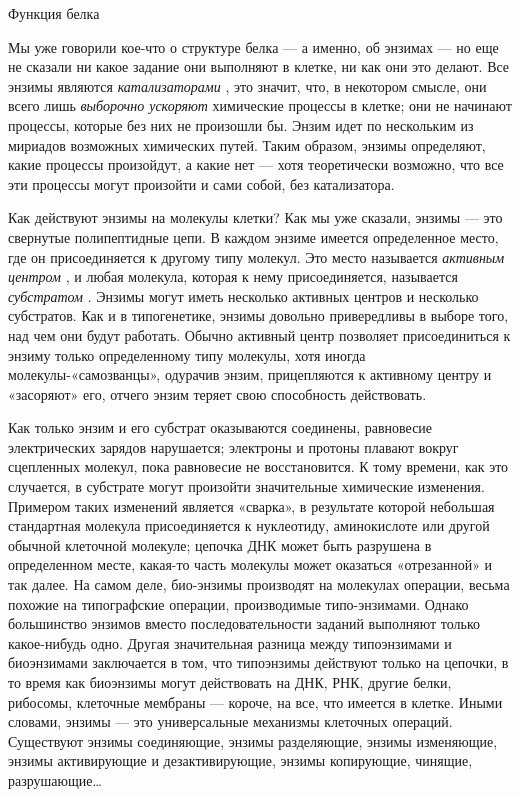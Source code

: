 \documentclass[../main.tex]{subfiles}
\begin{document}
Функция белка

Мы уже говорили кое-что о структуре белка --- а именно, об энзимах --- но еще не сказали ни какое задание они выполняют в клетке, ни как они это делают. Все энзимы являются \emph{катализаторами} , это значит, что, в некотором смысле, они всего лишь \emph{выборочно ускоряют} химические процессы в клетке; они не начинают процессы, которые без них не произошли бы. Энзим идет по нескольким из мириадов возможных химических путей. Таким образом, энзимы определяют, какие процессы произойдут, а какие нет --- хотя теоретически возможно, что все эти процессы могут произойти и сами собой, без катализатора.

Как действуют энзимы на молекулы клетки? Как мы уже сказали, энзимы --- это свернутые полипептидные цепи. В каждом энзиме имеется определенное место, где он присоединяется к другому типу молекул. Это место называется \emph{активным центром} , и любая молекула, которая к нему присоединяется, называется \emph{субстратом} . Энзимы могут иметь несколько активных центров и несколько субстратов. Как и в типогенетике, энзимы довольно привередливы в выборе того, над чем они будут работать. Обычно активный центр позволяет присоединиться к энзиму только определенному типу молекулы, хотя иногда молекулы-«самозванцы», одурачив энзим, прицепляются к активному центру и «засоряют» его, отчего энзим теряет свою способность действовать.

Как только энзим и его субстрат оказываются соединены, равновесие электрических зарядов нарушается; электроны и протоны плавают вокруг сцепленных молекул, пока равновесие не восстановится. К тому времени, как это случается, в субстрате могут произойти значительные химические изменения. Примером таких изменений является «сварка», в результате которой небольшая стандартная молекула присоединяется к нуклеотиду, аминокислоте или другой обычной клеточной молекуле; цепочка ДНК может быть разрушена в определенном месте, какая-то часть молекулы может оказаться «отрезанной» и так далее. На самом деле, био-энзимы производят на молекулах операции, весьма похожие на типографские операции, производимые типо-энзимами. Однако большинство энзимов вместо последовательности заданий выполняют только какое-нибудь одно. Другая значительная разница между типоэнзимами и биоэнзимами заключается в том, что типоэнзимы действуют только на цепочки, в то время как биоэнзимы могут действовать на ДНК, РНК, другие белки, рибосомы, клеточные мембраны --- короче, на все, что имеется в клетке. Иными словами, энзимы --- это универсальные механизмы клеточных операций. Существуют энзимы соединяющие, энзимы разделяющие, энзимы изменяющие, энзимы активирующие и дезактивирующие, энзимы копирующие, чинящие, разрушающие\ldots{}
\end{document}
